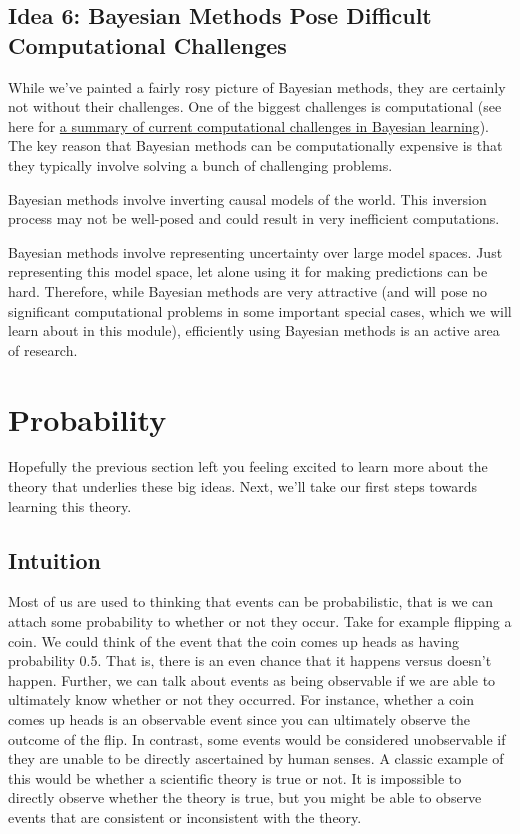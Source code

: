 \documentclass[assignment01_Solutions]{subfiles}
\begin{document}
\subsection*{Idea 6: Bayesian Methods Pose Difficult Computational Challenges}
While we've painted a fairly rosy picture of Bayesian methods, they are certainly not without their challenges.  One of the biggest challenges is computational (see here for \href{https://link.springer.com/article/10.1007/s11222-015-9574-5}{a summary of current computational challenges in Bayesian learning}).  The key reason that Bayesian methods can be computationally expensive is that they typically involve solving a bunch of challenging problems.
\bi
\item Bayesian methods involve inverting causal models of the world.  This inversion process may not be well-posed and could result in very inefficient computations.
\item Bayesian methods involve representing uncertainty over large model spaces.  Just representing this model space, let alone using it for making predictions can be hard.
\ei
Therefore, while Bayesian methods are very attractive (and will pose no significant computational problems in some important special cases, which we will learn about in this module), efficiently using Bayesian methods is an active area of research.

\section{Probability}

Hopefully the previous section left you feeling excited to learn more about the theory that underlies these big ideas.  Next, we'll take our first steps towards learning this theory.

\subsection{Intuition}
Most of us are used to thinking that events can be probabilistic, that is we can attach some probability to whether or not they occur.  Take for example flipping a coin.  We could think of the event that the coin comes up heads as having probability 0.5.  That is, there is an even chance that it happens versus doesn’t happen.  Further, we can talk about events as being observable if we are able to ultimately know whether or not they occurred.  For instance, whether a coin comes up heads is an observable event since you can ultimately observe the outcome of the flip.  In contrast, some events would be considered unobservable if they are unable to be directly ascertained by human senses.  A classic example of this would be whether a scientific theory is true or not.  It is impossible to directly observe whether the theory is true, but you might be able to observe events that are consistent or inconsistent with the theory.
\end{document}
